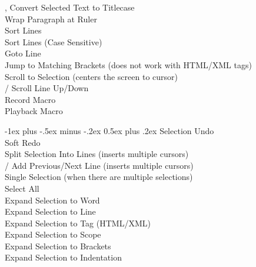 \documentclass[10pt,landscape]{article}
\makeatletter
\renewcommand{\section}{\@startsection{section}{1}{0mm}%
                                {-1ex plus -.5ex minus -.2ex}%
                                {0.5ex plus .2ex}%
                                {\normalfont\large\bfseries}}
\makeatother
\begin{document}
\begin{multicols}{3}
,  Convert Selected Text to Titlecase \\
 Wrap Paragraph at Ruler \\
 Sort Lines \\
 Sort Lines (Case Sensitive) \\
 Goto Line \\
 Jump to Matching Brackets (does not work with HTML/XML tags) \\
 Scroll to Selection (centers the screen to cursor) \\
\keys{\ctrl+\Alt+\arrowkeyup}/\keys{\arrowkeydown} Scroll Line Up/Down \\
 Record Macro \\
 Playback Macro

\section{Selection}
 Undo \\
 Soft Redo \\
 Split Selection Into Lines (inserts multiple cursors) \\
\keys{\ctrl+\shift+\arrowkeyup}/\keys{\arrowkeydown} Add Previous/Next Line (inserts multiple cursors) \\
\keys{\esc} Single Selection (when there are multiple selections) \\
 Select All \\
 Expand Selection to Word \\
 Expand Selection to Line \\
 Expand Selection to Tag (HTML/XML) \\
\keys{\cmd+\shift+\space} Expand Selection to Scope \\
 Expand Selection to Brackets \\
 Expand Selection to Indentation \\


\end{multicols}
\end{document}
